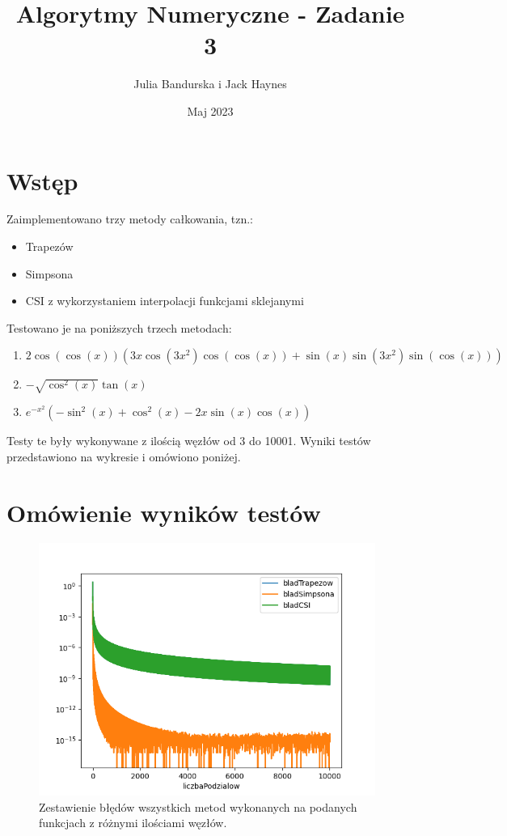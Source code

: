 \documentclass{article}
\title{Algorytmy Numeryczne - Zadanie 3}
\author{Julia Bandurska i Jack Haynes}
\date{Maj 2023}
\begin{document}
\maketitle

\section{Wstęp}

Zaimplementowano trzy metody całkowania, tzn.:
\begin{itemize}
    \item Trapezów
    \item Simpsona
    \item CSI z wykorzystaniem interpolacji funkcjami sklejanymi
\end{itemize}

Testowano je na poniższych trzech metodach:
\begin{enumerate}
    \item \(2\cos(\cos(x)) (3x\cos(3x^2)\cos(\cos(x)) + \sin(x)\sin(3x^2) \sin(\cos(x)))\)
    \item \(-\sqrt{\cos^2(x)} \tan(x)\)
    \item \(e^{-x^2} (-\sin^2(x) + \cos^2(x) - 2x\sin(x)\cos(x))\)
\end{enumerate}

Testy te były wykonywane z ilością węzłów od 3 do 10001. Wyniki testów przedstawiono na wykresie i omówiono poniżej. 

\section{Omówienie wyników testów}

\begin{figure}[ht]
    \centering
    \includegraphics[width=11cm]{alg_num_zad3.png}
    \caption{Zestawienie błędów wszystkich metod wykonanych na podanych funkcjach z różnymi ilościami węzłów.}
    \label{fig:bledy}
\end{figure}
\end{document}
